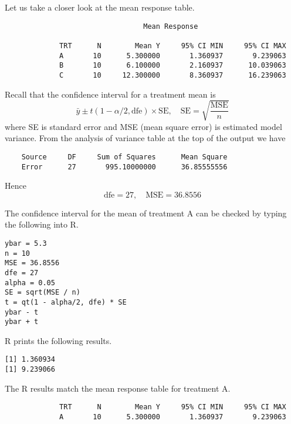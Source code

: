 \documentclass[12pt]{article}
\begin{document}
Let us take a closer look at the mean response table.

{\scriptsize\begin{verbatim}
                                 Mean Response

             TRT      N        Mean Y     95% CI MIN     95% CI MAX
             A       10      5.300000       1.360937       9.239063
             B       10      6.100000       2.160937      10.039063
             C       10     12.300000       8.360937      16.239063
\end{verbatim}}

Recall that the confidence interval for a treatment mean is
\begin{equation*}
\bar y\pm t(1-\alpha/2,\text{dfe})\times\text{SE},
\quad
\text{SE}=\sqrt{\frac{\text{MSE}}{n}}
\end{equation*}
where SE is standard error and MSE (mean square error) is estimated model variance.
From the analysis of variance table at the top of the output we have

{\scriptsize\begin{verbatim}
    Source     DF     Sum of Squares      Mean Square
    Error      27       995.10000000      36.85555556
\end{verbatim}}

Hence
\begin{equation*}
\text{dfe}=27,
\quad
\text{MSE}=36.8556
\end{equation*}

The confidence interval for the mean of treatment A can be checked by typing the following into R.

{\scriptsize\begin{verbatim}
ybar = 5.3
n = 10
MSE = 36.8556
dfe = 27
alpha = 0.05
SE = sqrt(MSE / n)
t = qt(1 - alpha/2, dfe) * SE
ybar - t
ybar + t
\end{verbatim}}

R prints the following results.

{\scriptsize\begin{verbatim}
[1] 1.360934
[1] 9.239066
\end{verbatim}}

The R results match the mean response table for treatment A.

{\scriptsize\begin{verbatim}
             TRT      N        Mean Y     95% CI MIN     95% CI MAX
             A       10      5.300000       1.360937       9.239063
\end{verbatim}}
\end{document}

